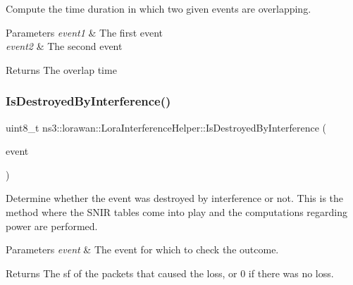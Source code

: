 Compute the time duration in which two given events are overlapping.


\begin{DoxyParams}{Parameters}
{\em event1} & The first event \\
\hline
{\em event2} & The second event\\
\hline
\end{DoxyParams}
\begin{DoxyReturn}{Returns}
The overlap time 
\end{DoxyReturn}
\mbox{\label{classns3_1_1lorawan_1_1LoraInterferenceHelper_ad37985e0b3cbcd00bdce3b36e5729b37}} 
\subsubsection{\texorpdfstring{Is\+Destroyed\+By\+Interference()}{IsDestroyedByInterference()}}
{\footnotesize\ttfamily uint8\+\_\+t ns3\+::lorawan\+::\+Lora\+Interference\+Helper\+::\+Is\+Destroyed\+By\+Interference (\begin{DoxyParamCaption}\item[{Ptr$<$ \hyperlink{classns3_1_1lorawan_1_1LoraInterferenceHelper_1_1Event}{Lora\+Interference\+Helper\+::\+Event} $>$}]{event }\end{DoxyParamCaption})}

Determine whether the event was destroyed by interference or not. This is the method where the S\+N\+IR tables come into play and the computations regarding power are performed.


\begin{DoxyParams}{Parameters}
{\em event} & The event for which to check the outcome. \\
\hline
\end{DoxyParams}
\begin{DoxyReturn}{Returns}
The sf of the packets that caused the loss, or 0 if there was no loss. 
\end{DoxyReturn}
\mbox{\label{classns3_1_1lorawan_1_1LoraInterferenceHelper_ade1d830e7be5745bbb9c93f890aef501}} 
